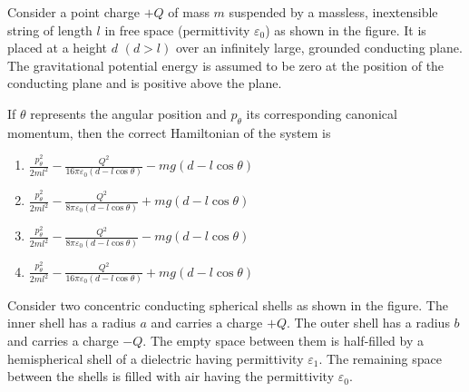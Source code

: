 \iffalse
\chapter{2021}
\author{EE24BTECH11040}
\section{ph}
\fi

\item Consider a point charge $+Q$ of mass $m$ suspended by a massless, inextensible string of length $l$ in free space (permittivity $\varepsilon_0$) as shown in the figure. It is placed at a height $d$ $(d>l)$ over an infinitely large, grounded conducting plane. The gravitational potential energy is assumed to be zero at the position of the conducting plane and is positive above the plane.

\vspace{0.5 cm}


If $\theta$ represents the angular position and $p_\theta$ its corresponding canonical momentum, then the correct Hamiltonian of the system is

\begin{enumerate}
\item $\frac{p^2_\theta}{2ml^2}-\frac{Q^2}{16\pi\varepsilon_0(d-l\cos{\theta})}-mg(d-l\cos{\theta})$
\item $\frac{p^2_\theta}{2ml^2}-\frac{Q^2}{8\pi\varepsilon_0(d-l\cos{\theta})}+mg(d-l\cos{\theta})$
\item $\frac{p^2_\theta}{2ml^2}-\frac{Q^2}{8\pi\varepsilon_0(d-l\cos{\theta})}-mg(d-l\cos{\theta})$
\item $\frac{p^2_\theta}{2ml^2}-\frac{Q^2}{16\pi\varepsilon_0(d-l\cos{\theta})}+mg(d-l\cos{\theta})$
\end{enumerate}

\item Consider two concentric conducting spherical shells as shown in the figure. The inner shell has a radius $a$ and carries a charge $+Q$. The outer shell has a radius $b$ and carries a charge $-Q$. The empty space between them is half-filled by a hemispherical shell of a dielectric having permittivity $\varepsilon_1$. The remaining space between the shells is filled with air having the permittivity $\varepsilon_0$.

